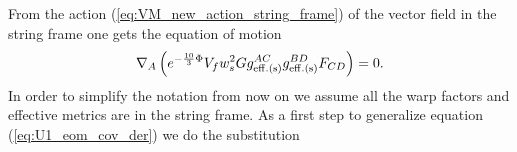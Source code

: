 \documentclass[a4paper,12pt]{article}
\begin{document}

From the action (\ref{eq:VM_new_action_string_frame}) of the vector field in the string frame one gets the equation of motion
\begin{equation}
\nabla_{A} \left(e^{-\frac{10}{3} \Phi} V_f w_s^2 G g^{AC}_{\rm{eff. (s)}}g^{BD}_{\rm{eff. (s)}}F_{CD}  \right) = 0.
\label{eq:U1_eom_cov_der}
\end{equation}
In order to simplify the notation from now on we assume all the warp factors and effective metrics are in the string frame.
As a first step to generalize equation (\ref{eq:U1_eom_cov_der}) we do the substitution
\end{document}
